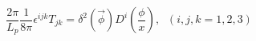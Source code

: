 \begin{equation}
\frac{2\pi }{L_p}\frac 1{8\pi }\epsilon ^{ijk}T_{jk}=\delta ^2(\vec{\phi}%
)D^i(\frac \phi x),\;\;(i,j,k=1,2,3)  \label{jidel}
\end{equation}

